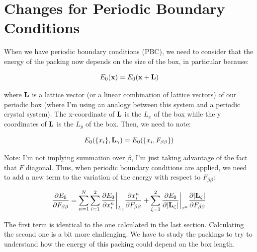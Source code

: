 \documentclass[12pt]{article}
\begin{document}
\section{Changes for Periodic Boundary Conditions}
When we have periodic boundary conditions (PBC), we need to consider that the energy of the packing now depends on the size of the box, in particular because:
\begin{center}
\begin{equation}
\label{eqn: periodic}
E_0(\vb{x}) = E_0(\vb{x} + \vb{L}) 
\end{equation}
\end{center}
where $\vb{L}$ is a lattice vector (or a linear combination of lattice vectors) of our periodic box (where I'm using an analogy between this system and a periodic crystal system). 
The x-coordinate of $\vb{L}$ is the $L_x$ of the box while the y coordinates of $\vb{L}$ is the $L_y$ of the box. Then, we need to note:
\begin{center}
\begin{equation}
\label{eqn: newdepen}
E_0(\{x_i\}, \vb{L}_{\gamma}) = E_0(\{x_i, F_{\beta\beta}\})
\end{equation}
\end{center} 
Note: I'm not implying summation over $\beta$, I'm just taking advantage of the fact that $F$ diagonal. Thus, when periodic boundary conditions are applied, we need to add a new term to the variation of the energy with respect to $F_{\beta\beta}$:
\begin{center}
\begin{equation}
\label{eqn: dedf}
\pdv{E_0}{F_{\beta \beta}} = \sum\limits_{n=1}^{N}\sum\limits_{i=1}^{2} \pdv{E_0}{x_i^n}\bigg\vert_{L_\zeta} \pdv{x_i^n}{F_{\beta\beta}} + \sum\limits_{\zeta=1}^{2} \pdv{E_0}{|\vb{L}_\zeta|}\bigg\vert_{x^n} \pdv{|\vb{L}_\zeta|}{F_{\beta\beta}}
\end{equation}
\end{center}
The first term is identical to the one calculated in the last section. Calculating the second one is a bit more challenging. We have to study the packings to try to understand how the energy of this packing could depend on the box length.
\end{document}
